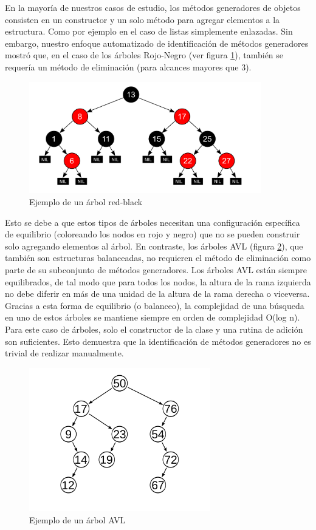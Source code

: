 En la mayoría de nuestros casos de estudio, los métodos generadores de objetos consisten en un constructor y un solo método para agregar elementos a la estructura. 
Como por ejemplo en el caso de listas simplemente enlazadas. 
Sin embargo, nuestro enfoque automatizado de identificación de métodos generadores mostró que, 
en el caso de los árboles Rojo-Negro (ver figura \ref{fig:redBlack1}), también se requería un método de eliminación (para alcances mayores que 3). 

\begin{figure}
  \centering
  \includegraphics[width=0.9\textwidth]{images/redBlackTree.jpg}
  \caption{Ejemplo de un árbol red-black}
  \label{fig:redBlack1}
\end{figure}

Esto se debe a que estos tipos de árboles necesitan una configuración específica de equilibrio (coloreando los nodos en rojo y negro) 
que no se pueden construir solo agregando elementos al árbol. En contraste, los árboles AVL (figura \ref{fig:avl}), 
que también son estructuras balanceadas, no requieren el método de eliminación como parte de su subconjunto de métodos generadores.
Los árboles AVL están siempre equilibrados, 
de tal modo que para todos los nodos, la altura de la rama izquierda no debe diferir en más de una unidad de la altura de la rama derecha o viceversa. 
Gracias a esta forma de equilibrio (o balanceo), la complejidad de una búsqueda en uno de estos árboles se mantiene siempre en orden de complejidad O(log n). 
Para este caso de árboles, solo el constructor de la clase y una rutina de adición son suficientes. 
Esto demuestra que la identificación de métodos generadores no es trivial de realizar manualmente.



\begin{figure}
  \centering
  \includegraphics[width=0.7\textwidth]{images/avl.jpg}
  \caption{Ejemplo de un árbol AVL}
  \label{fig:avl}
\end{figure}

